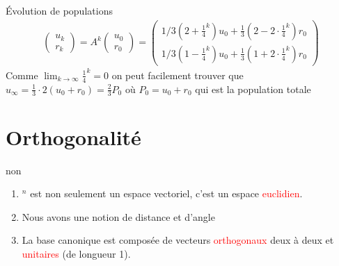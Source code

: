 \begin{parag}{Évolution de populations}
\begin{align*}
    \begin{pmatrix}
        u_k\\r_k
    \end{pmatrix} = A^k\begin{pmatrix}
        u_0\\r_0
    \end{pmatrix} = \begin{pmatrix}
        1/3(2+\frac{1}{4}^k)u_0 + \frac{1}{3}(2-2\cdot\frac{1}{4}^k)r_0\\
        1/3(1-\frac{1}{4}^k)u_0 + \frac{1}{3}(1 + 2\cdot\frac{1}{4}^k)r_0
    \end{pmatrix}
\end{align*}
Comme $\lim_{k\to \infty} \frac{1}{4}^k = 0$ on peut facilement trouver que $u_\infty = \frac{1}{3}\cdot2 (u_0 + r_0) = \frac{2}{3}P_0$ où $P_0 = u_0 + r_0$ qui est la population totale
\end{parag}


\chapter{Orthogonalité}
\begin{parag}{non}
    

\begin{enumerate}
    \item \R$^n$ est non seulement un espace vectoriel, c'est un espace \textcolor{red}{euclidien}.
    \item  Nous avons une notion de distance et d'angle
    \item La base canonique est composée de vecteurs \textcolor{red}{orthogonaux} deux à deux et \textcolor{red}{unitaires} (de longueur 1).
\end{enumerate}

\end{parag}

